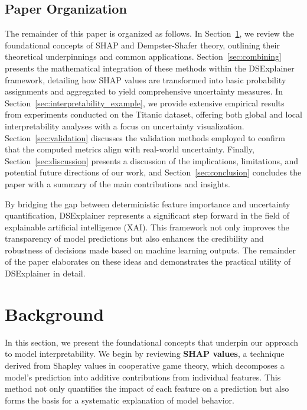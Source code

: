 \documentclass[acmlarge]{acmart}
\begin{document}
\subsection{Paper Organization}
The remainder of this paper is organized as follows. In Section~\ref{sec:background}, we review the foundational concepts of SHAP and Dempster-Shafer theory, outlining their theoretical underpinnings and common applications. Section~\ref{sec:combining} presents the mathematical integration of these methods within the DSExplainer framework, detailing how SHAP values are transformed into basic probability assignments and aggregated to yield comprehensive uncertainty measures. In Section~\ref{sec:interpretability_example}, we provide extensive empirical results from experiments conducted on the Titanic dataset, offering both global and local interpretability analyses with a focus on uncertainty visualization. Section~\ref{sec:validation} discusses the validation methods employed to confirm that the computed metrics align with real-world uncertainty. Finally, Section~\ref{sec:discussion} presents a discussion of the implications, limitations, and potential future directions of our work, and Section~\ref{sec:conclusion} concludes the paper with a summary of the main contributions and insights.

By bridging the gap between deterministic feature importance and uncertainty quantification, DSExplainer represents a significant step forward in the field of explainable artificial intelligence (XAI). This framework not only improves the transparency of model predictions but also enhances the credibility and robustness of decisions made based on machine learning outputs. The remainder of the paper elaborates on these ideas and demonstrates the practical utility of DSExplainer in detail.


\section{Background}
\label{sec:background}

In this section, we present the foundational concepts that underpin our approach to model interpretability. We begin by reviewing \textbf{SHAP values}, a technique derived from Shapley values in cooperative game theory, which decomposes a model’s prediction into additive contributions from individual features. This method not only quantifies the impact of each feature on a prediction but also forms the basis for a systematic explanation of model behavior.
\end{document}
